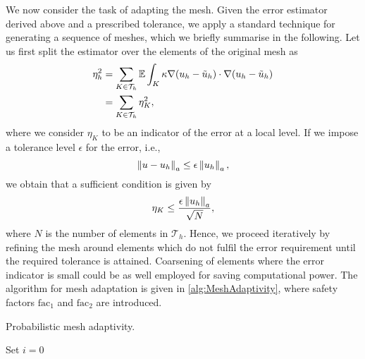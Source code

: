 \documentclass[10pt]{article}
\begin{document}
We now consider the task of adapting the mesh. Given the error estimator derived above and a prescribed tolerance, we apply a standard technique for generating a sequence of meshes, which we briefly summarise in the following. Let us first split the estimator over the elements of the original mesh as
\begin{equation}
\begin{aligned}
	\eta_h^2 &= \sum_{K\in \mathcal T_h} \operatorname{\mathbb{E}} \int_{K} \kappa \nabla (u_h - \tilde u_h) \cdot \nabla (u_h - \tilde u_h)\\
	&= \sum_{K \in \mathcal T_h} \eta_K^2,
\end{aligned}
\end{equation}
where we consider $\eta_K$ to be an indicator of the error at a local level. If we impose a tolerance level $\epsilon$ for the error, i.e.,
\begin{equation}
	\left\|u - u_h\right\|_a \leq \epsilon \left\|u_h\right\|_a,  
\end{equation}	 
we obtain that a sufficient condition is given by 
\begin{equation}
	\eta_K \leq \frac{\epsilon \left\|u_h\right\|_a}{\sqrt{N}},
\end{equation}
where $N$ is the number of elements in $\mathcal T_h$. Hence, we proceed iteratively by refining the mesh around elements which do not fulfil the error requirement until the required tolerance is attained. Coarsening of elements where the error indicator is small could be as well employed for saving computational power. The algorithm for mesh adaptation is given in \cref{alg:MeshAdaptivity}, where safety factors $\mathrm{fac}_1$ and $\mathrm{fac}_2$ are introduced. 

\begin{algorithm}[t]
	\caption{Probabilistic mesh adaptivity.}
	\label{alg:MeshAdaptivity}
	Set $i = 0$ \;
\end{algorithm}
\end{document}
